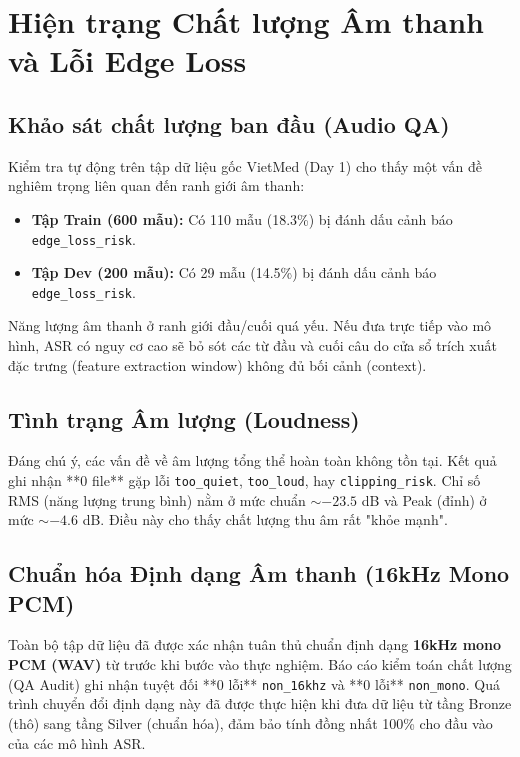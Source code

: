 \documentclass[12pt,a4paper]{article}
\begin{document}
\section{Hiện trạng Chất lượng Âm thanh và Lỗi Edge Loss}

\subsection{Khảo sát chất lượng ban đầu (Audio QA)}
Kiểm tra tự động trên tập dữ liệu gốc VietMed (Day 1) cho thấy một vấn đề nghiêm trọng liên quan đến ranh giới âm thanh:
\begin{itemize}[leftmargin=1.2cm]
    \item \textbf{Tập Train (600 mẫu):} Có 110 mẫu (18.3\%) bị đánh dấu cảnh báo \texttt{edge\_loss\_risk}.
    \item \textbf{Tập Dev (200 mẫu):} Có 29 mẫu (14.5\%) bị đánh dấu cảnh báo \texttt{edge\_loss\_risk}.
\end{itemize}
Năng lượng âm thanh ở ranh giới đầu/cuối quá yếu. Nếu đưa trực tiếp vào mô hình, ASR có nguy cơ cao sẽ bỏ sót các từ đầu và cuối câu do cửa sổ trích xuất đặc trưng (feature extraction window) không đủ bối cảnh (context).

\subsection{Tình trạng Âm lượng (Loudness)}
Đáng chú ý, các vấn đề về âm lượng tổng thể hoàn toàn không tồn tại. Kết quả ghi nhận **0 file** gặp lỗi \texttt{too\_quiet}, \texttt{too\_loud}, hay \texttt{clipping\_risk}.
Chỉ số RMS (năng lượng trung bình) nằm ở mức chuẩn $\sim -23.5$ dB và Peak (đỉnh) ở mức $\sim -4.6$ dB. Điều này cho thấy chất lượng thu âm rất "khỏe mạnh".

\subsection{Chuẩn hóa Định dạng Âm thanh (16kHz Mono PCM)}
Toàn bộ tập dữ liệu đã được xác nhận tuân thủ chuẩn định dạng \textbf{16kHz mono PCM (WAV)} từ trước khi bước vào thực nghiệm. Báo cáo kiểm toán chất lượng (QA Audit) ghi nhận tuyệt đối **0 lỗi** \texttt{non\_16khz} và **0 lỗi** \texttt{non\_mono}. Quá trình chuyển đổi định dạng này đã được thực hiện khi đưa dữ liệu từ tầng Bronze (thô) sang tầng Silver (chuẩn hóa), đảm bảo tính đồng nhất 100\% cho đầu vào của các mô hình ASR.
\end{document}
